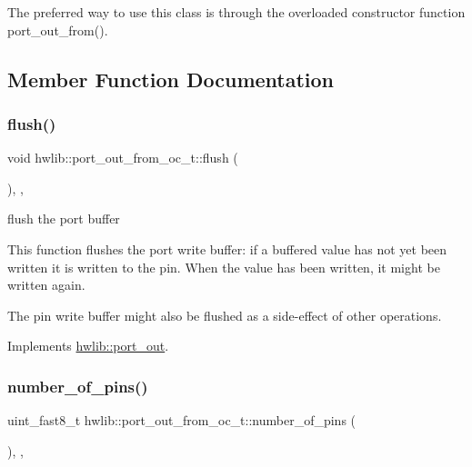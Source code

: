 The preferred way to use this class is through the overloaded constructor function port\+\_\+out\+\_\+from(). 

\subsection{Member Function Documentation}
\mbox{\label{classhwlib_1_1port__out__from__oc__t_ae85b5828e71f11c12bfe78b54afb2088}} 
\subsubsection{\texorpdfstring{flush()}{flush()}}
{\footnotesize\ttfamily void hwlib\+::port\+\_\+out\+\_\+from\+\_\+oc\+\_\+t\+::flush (\begin{DoxyParamCaption}{ }\end{DoxyParamCaption})\hspace{0.3cm}{\ttfamily [inline]}, {\ttfamily [override]}, {\ttfamily [virtual]}}





flush the port buffer

This function flushes the port write buffer\+: if a buffered value has not yet been written it is written to the pin. When the value has been written, it might be written again.

The pin write buffer might also be flushed as a side-\/effect of other operations. 

Implements \hyperlink{classhwlib_1_1port__out_aff7c8d768ec0b7f3d738a47ef1a4bbfe}{hwlib\+::port\+\_\+out}.

\mbox{\label{classhwlib_1_1port__out__from__oc__t_a25961246ca2c7433fc7534d479a58537}} 
\subsubsection{\texorpdfstring{number\+\_\+of\+\_\+pins()}{number\_of\_pins()}}
{\footnotesize\ttfamily uint\+\_\+fast8\+\_\+t hwlib\+::port\+\_\+out\+\_\+from\+\_\+oc\+\_\+t\+::number\+\_\+of\+\_\+pins (\begin{DoxyParamCaption}{ }\end{DoxyParamCaption})\hspace{0.3cm}{\ttfamily [inline]}, {\ttfamily [override]}, {\ttfamily [virtual]}}





